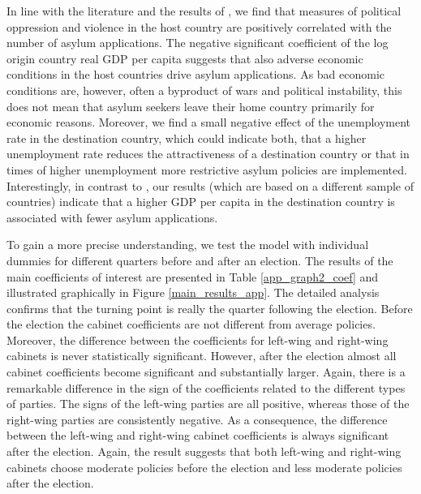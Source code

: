 \documentclass[a4paper,12pt]{article}
\begin{document}
In line with the literature and the results of \citet{hatton2016}, we find that measures of political oppression and violence in the host country are positively correlated with the number of asylum applications. The negative significant coefficient of the log origin country real GDP per capita suggests that also adverse economic conditions in the host countries drive asylum applications. As bad economic conditions are, however, often a byproduct of wars and political instability, this does not mean that asylum seekers leave their home country primarily for economic reasons. Moreover, we find a small negative effect of the unemployment rate in the destination country, which could indicate both, that a higher unemployment rate reduces the attractiveness of a destination country or that in times of higher unemployment more restrictive asylum policies are implemented. Interestingly, in contrast to \citet{hatton2016}, our results (which are based on a different sample of countries) indicate that a higher GDP per capita in the destination country is associated with fewer asylum applications. 

To gain a more precise understanding, we test the model with individual dummies for different quarters before and after an election. The results of the main coefficients of interest are presented in Table \ref{app_graph2_coef} and illustrated graphically in Figure \ref{main_results_app}. The detailed analysis confirms that the turning point is really the quarter following the election. Before the election the cabinet coefficients are not different from average policies. Moreover, the difference between the coefficients for left-wing and right-wing cabinets is never statistically significant. However, after the election almost all cabinet coefficients become significant and substantially larger. Again, there is a remarkable difference in the sign of the coefficients related to the different types of parties. The signs of the left-wing parties are all positive, whereas those of the right-wing parties are consistently negative. As a consequence, the difference between the left-wing and right-wing cabinet coefficients is always significant after the election. Again, the result suggests that both left-wing and right-wing cabinets choose moderate policies before the election and less moderate policies after the election. 


\end{document}

